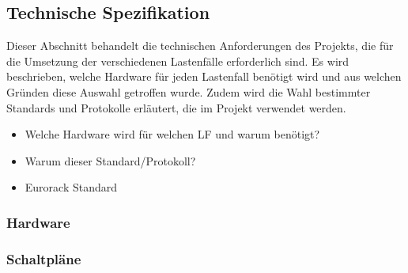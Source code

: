\newpage
\subsection{Technische Spezifikation}
Dieser Abschnitt behandelt die technischen Anforderungen des Projekts, die für die Umsetzung der verschiedenen Lastenfälle erforderlich sind. Es wird beschrieben, welche Hardware für jeden Lastenfall benötigt wird und aus welchen Gründen diese Auswahl getroffen wurde. Zudem wird die Wahl bestimmter Standards und Protokolle erläutert, die im Projekt verwendet werden.

\begin{itemize}
	\item Welche Hardware wird für welchen LF und warum benötigt?
	\item Warum dieser Standard/Protokoll?
	\item Eurorack Standard
\end{itemize}

\subsubsection{Hardware}





\newpage
\subsubsection{Schaltpläne}


\begin{figure}[ht]
	\centering
	
	\label{fig:audio_test_schematic}
\end{figure}

\newpage
\begin{figure}[ht]
	\centering
	
	\label{fig:interface_test_schematic}
\end{figure}